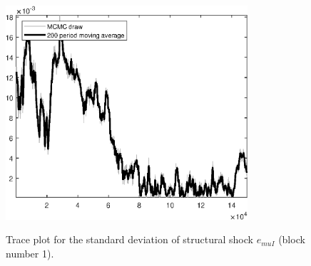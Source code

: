 \begin{figure}[H]
\centering
  \includegraphics[width=0.8\textwidth]{BRS_sectoral_KK/graphs/TracePlot_SE_e_muI_blck_1}\\
    \caption{Trace plot for the standard deviation of structural shock ${e_{muI}}$ (block number 1).}
\end{figure}
